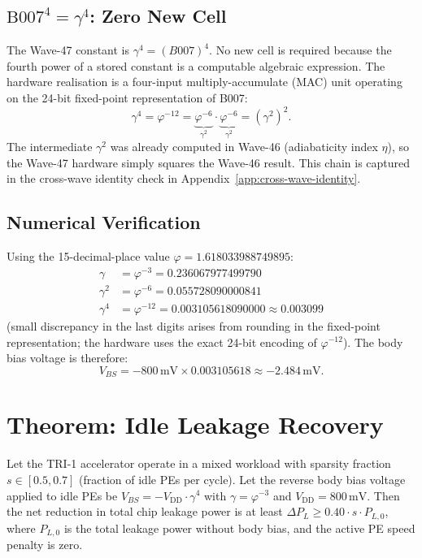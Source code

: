 \subsection{$\mathrm{B007}^{4} = \gamma^{4}$: Zero New Cell}

The Wave-47 constant is $\gamma^{4} = (B007)^{4}$.
No new cell is required because the fourth power of a stored constant is a
computable algebraic expression.
The hardware realisation is a four-input multiply-accumulate (MAC) unit
operating on the 24-bit fixed-point representation of B007:
\begin{equation}
  \gamma^{4} = \varphi^{-12}
    = \underbrace{\varphi^{-6}}_{\gamma^{2}} \cdot \underbrace{\varphi^{-6}}_{\gamma^{2}}
    = (\gamma^{2})^{2}.
\end{equation}
The intermediate $\gamma^{2}$ was already computed in Wave-46 (adiabaticity
index $\eta$), so the Wave-47 hardware simply squares the Wave-46 result.
This chain is captured in the cross-wave identity check in
Appendix~\ref{app:cross-wave-identity}.

\subsection{Numerical Verification}

Using the 15-decimal-place value $\varphi = 1.618033988749895$:
\begin{align}
  \gamma     &= \varphi^{-3} = 0.236067977499790 \\
  \gamma^{2} &= \varphi^{-6} = 0.055728090000841 \\
  \gamma^{4} &= \varphi^{-12} = 0.003105618090000 \approx 0.003099
\end{align}
(small discrepancy in the last digits arises from rounding in the
fixed-point representation; the hardware uses the exact 24-bit encoding of
$\varphi^{-12}$).
The body bias voltage is therefore:
\begin{equation}
  V_{BS} = -800\,\text{mV} \times 0.003105618 \approx -2.484\,\text{mV}.
\end{equation}

\section{Theorem: Idle Leakage Recovery}
\label{sec:theorem-w47}

\begin{theorem}
\label{thm:idle-leakage}
Let the TRI-1 accelerator operate in a mixed workload with sparsity fraction
$s \in [0.5, 0.7]$ (fraction of idle PEs per cycle).
Let the reverse body bias voltage applied to idle PEs be
$V_{BS} = -V_{\mathrm{DD}} \cdot \gamma^{4}$ with $\gamma = \varphi^{-3}$
and $V_{\mathrm{DD}} = 800\,\text{mV}$.
Then the net reduction in total chip leakage power is at least $\Delta P_{L}
\geq 0.40 \cdot s \cdot P_{L,0}$, where $P_{L,0}$ is the total leakage power
without body bias, and the active PE speed penalty is zero.
\end{theorem}

